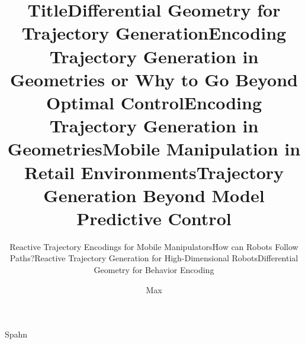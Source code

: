 \title[Optional Subtitle]{Title}
\author{Max}{Spahn}

\title{Differential Geometry for Trajectory Generation}
\subtitle{Reactive Trajectory Encodings for Mobile Manipulators}
\title{Encoding Trajectory Generation in Geometries or Why to Go Beyond Optimal
Control}
\subtitle{}
\title{Encoding Trajectory Generation in Geometries}
\subtitle{How can Robots Follow Paths?}
\title{Mobile Manipulation in Retail Environments}
\subtitle{Reactive Trajectory Generation for High-Dimensional Robots}
\title{Trajectory Generation Beyond Model Predictive Control}
\subtitle{Differential Geometry for Behavior Encoding}

